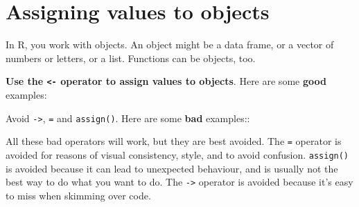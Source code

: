 \documentclass[]{book}
\newenvironment{Shaded}{\begin{snugshade}}{\end{snugshade}}
\newcommand{\KeywordTok}[1]{\textcolor[rgb]{0.13,0.29,0.53}{\textbf{#1}}}
\newcommand{\NormalTok}[1]{#1}
\newcommand{\OperatorTok}[1]{\textcolor[rgb]{0.81,0.36,0.00}{\textbf{#1}}}
\newcommand{\StringTok}[1]{\textcolor[rgb]{0.31,0.60,0.02}{#1}}
\begin{document}
\hypertarget{assigning-values-to-objects}{%
\section{Assigning values to objects}\label{assigning-values-to-objects}}

In R, you work with objects. An object might be a data frame, or a vector of numbers or letters, or a list. Functions can be objects, too.

\textbf{Use the \texttt{\textless{}-} operator to assign values to objects}. Here are some \textbf{good} examples:

\begin{Shaded}
\end{Shaded}

Avoid \texttt{-\textgreater{}}, \texttt{=} and \texttt{assign()}. Here are some \textbf{bad} examples::

\begin{Shaded}
\end{Shaded}

All these bad operators will work, but they are best avoided. The \texttt{=} operator is avoided for reasons of visual consistency, style, and to avoid confusion. \texttt{assign()} is avoided because it can lead to unexpected behaviour, and is usually not the best way to do what you want to do. The \texttt{-\textgreater{}} operator is avoided because it's easy to miss when skimming over code.
\end{document}
